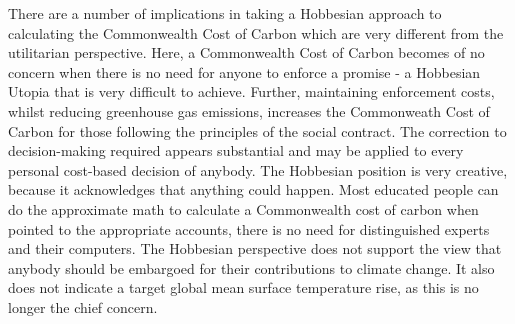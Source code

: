 \documentclass[11pt, oneside]{article}   	%
\begin{document}
There are a number of implications in taking a Hobbesian approach to calculating the Commonwealth Cost of Carbon which are very different from the utilitarian perspective.
Here, a Commonwealth Cost of Carbon becomes of no concern when there is no need for anyone to enforce a promise - a Hobbesian Utopia that is very difficult to achieve.
Further, maintaining enforcement costs, whilst reducing greenhouse gas emissions, increases the Commonweath Cost of Carbon for those following the principles of the social contract.
The correction to decision-making required appears substantial and may be applied to every personal cost-based decision of anybody.
The Hobbesian position is very creative, because it acknowledges that anything could happen.
Most educated people can do the approximate math to calculate a Commonwealth cost of carbon when pointed to the appropriate accounts, there is no need for distinguished experts and their computers.
The Hobbesian perspective does not support the view that anybody should be embargoed for their contributions to climate change.
It also does not indicate a target global mean surface temperature rise, as this is no longer the chief concern.\
\end{document}
